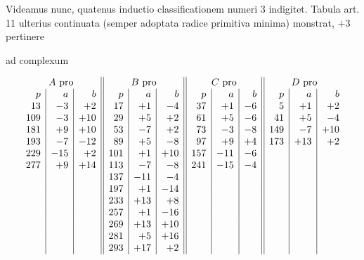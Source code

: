 Videamus nunc, quatenus inductio classificationem numeri $3$ indigitet. Tabula art. 11 ulterius continuata (semper adoptata radice primitiva minima) monstrat, $+3$ pertinere
\begin{center}ad complexum\end{center}
\[
\begin{array}{r|r|r||r|r|r||r|r|r||r|r|r}
\multicolumn{3}{c||}{A\ \text{pro}}&\multicolumn{3}{c||}{B\ \text{pro}}&\multicolumn{3}{c||}{C\ \text{pro}}&\multicolumn{3}{c}{D\ \text{pro}}\\
p&a&b&p&a&b&p&a&b&p&a&b\\
13&-3&+2&17&+1&-4&37&+1&-6&5&+1&+2\\
109&-3&+10&29&+5&+2&61&+5&-6&41&+5&-4\\
181&+9&+10&53&-7&+2&73&-3&-8&149&-7&+10\\
193&-7&-12&89&+5&-8&97&+9&+4&173&+13&+2\\
229&-15&+2&101&+1&+10&157&-11&-6&&&\\
277&+9&+14&113&-7&-8&241&-15&-4&&&\\
&&&137&-11&-4&&&&&&\\
&&&197&+1&-14&&&&&&\\
&&&233&+13&+8&&&&&&\\
&&&257&+1&-16&&&&&&\\
&&&269&+13&+10&&&&&&\\
&&&281&+5&+16&&&&&&\\
&&&293&+17&+2&&&&&&
\end{array}
\]

